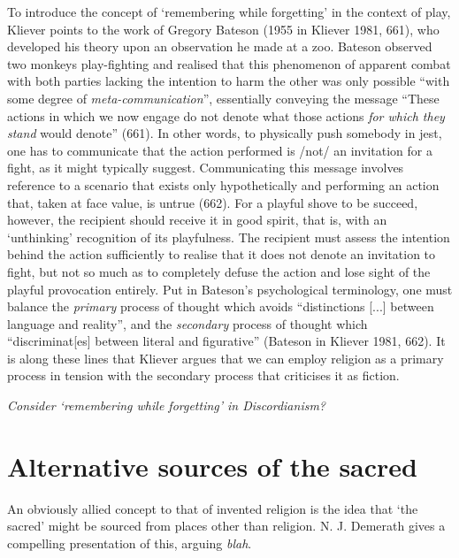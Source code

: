 \documentclass[Draft.tex]{subfiles}
\begin{document}
To introduce the concept of `remembering while forgetting'
in the context of play, Kliever points to the work of
Gregory Bateson (1955 in Kliever 1981, 661),
who developed his theory upon an observation he made at a zoo.
Bateson observed two monkeys play-fighting and realised that
this phenomenon of apparent combat with both parties lacking
the intention to harm the other was only possible
``with some degree of \textit{meta-communication}'',
essentially conveying the message
``These actions in which we now engage do not denote
what those actions \textit{for which they stand} would denote'' (661).
In other words, to physically push somebody in jest,
one has to communicate that the action performed
is /not/ an invitation for a fight, as it might typically suggest.
Communicating this message involves reference to
a scenario that exists only hypothetically and
performing an action that, taken at face value, is untrue (662).
For a playful shove to be succeed, however,
the recipient should receive it in good spirit, that is,
with an `unthinking' recognition of its playfulness.
The recipient must assess the intention behind the action sufficiently
to realise that it does not denote an invitation to fight,
but not so much as to completely defuse the action
and lose sight of the playful provocation entirely.
Put in Bateson's psychological terminology,
one must balance the \textit{primary} process of thought which
avoids ``distinctions [...] between language and reality'',
and the \textit{secondary} process of thought
which ``discriminat[es] between literal and figurative''
(Bateson in Kliever 1981, 662).
It is along these lines that Kliever argues that we can
employ religion as a primary process in tension with
the secondary process that criticises it as fiction.

\textit{Consider `remembering while forgetting' in Discordianism?}


\section*{Alternative sources of the sacred}
An obviously allied concept to that of invented religion
is the idea that `the sacred' might be sourced
from places other than religion.
N. J. Demerath \parencite*{Demerath00} gives a compelling presentation
of this, arguing \textit{blah}.
\end{document}
